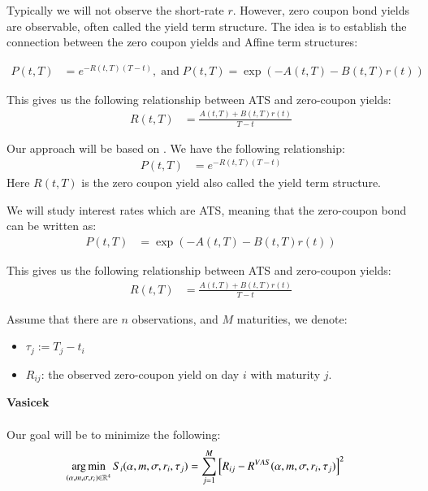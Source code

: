 Typically we will not observe the short-rate $r$. However, zero coupon bond yields are observable, often called the yield term structure. The idea is to establish the connection between the zero coupon yields and Affine term structures:

\begin{align*}
P(t,T) &= e^{-R(t,T)(T-t)}, \;\text{and}\;
P(t,T) = \exp\left(
-A(t,T) -B(t,T)r(t)
\right)
\end{align*}

This gives us the following relationship between ATS and zero-coupon yields: 
\begin{align*}
R(t,T) &= \frac{
A(t,T) + B(t,T)r(t)
}{
T-t
}    
\end{align*}













\newpage 
Our approach will be based on \cite{halga2014}. We have the following relationship: 
\begin{align*}
P(t,T) &= e^{-R(t,T)(T-t)}
\end{align*}
Here $R(t,T)$ is the zero coupon yield also called the yield term structure. 


We will study interest rates which are ATS, meaning that the zero-coupon bond can be written as:
\begin{align*}
P(t,T) &= 
\exp\left(
-A(t,T) -B(t,T)r(t)
\right)
\end{align*}

This gives us the following relationship between ATS and zero-coupon yields: 
\begin{align*}
R(t,T) &= \frac{
A(t,T) + B(t,T)r(t)
}{
T-t
}    
\end{align*}

Assume that there are $n$ observations, and $M$ maturities, we denote: 
\begin{itemize}
    \item $\tau_{j} := T_{j} - t_{i}$
    \item $R_{ij}$: the observed zero-coupon yield on day $i$ with maturity $j$. 
\end{itemize}

\textbf{Vasicek}
\\~\\
Our goal will be to minimize the following: 
\begin{align*}
\operatorname*{arg\,min}\limits_{(\alpha, m, \sigma, r_{i}) \in \mathbb{R}^{4}}
S_{i}(\alpha, m, \sigma, r_{i}, \tau_{j}) 
&= 
\sum_{j=1}^{M}\left[
R_{ij} - R^{VAS}(\alpha, m, \sigma, r_{i}, \tau_{j})
\right]^{2}
\end{align*}

